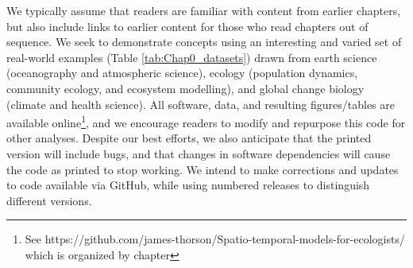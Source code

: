 We typically assume that readers are familiar with content from earlier chapters, but also include links to earlier content for those who read chapters out of sequence.  We seek to demonstrate concepts using an interesting and varied set of real-world examples (Table \ref{tab:Chap0_datasets}) drawn from earth science (oceanography and atmospheric science), ecology (population dynamics, community ecology, and ecosystem modelling), and global change biology (climate and health science). All software, data, and resulting figures/tables are available online\footnote{See https://github.com/james-thorson/Spatio-temporal-models-for-ecologists/ which is organized by chapter}, and we encourage readers to modify and repurpose this code for other analyses.  Despite our best efforts, we also anticipate that the printed version will include bugs, and that changes in software dependencies will cause the code as printed to stop working.  We intend to make corrections and updates to code available via GitHub, while using numbered releases to distinguish different versions.  

